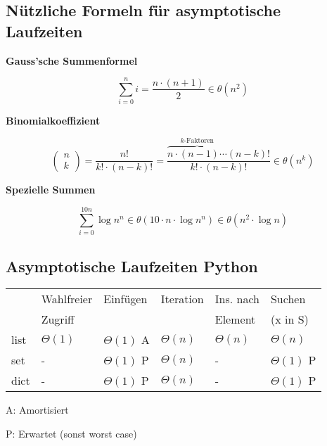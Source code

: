 \documentclass[german]{latex4ei/latex4ei_sheet}
\begin{document}
\begin{sectionbox}
\subsection{Nützliche Formeln für asymptotische Laufzeiten}\medskip

\textbf{Gauss'sche Summenformel}\par\vspace{-4px}
\begin{equation*}
    \boxed{\sum\limits_{i=0}^n i = \frac{n \cdot (n+1)}{2} \in \theta \left(n^2\right)}
\end{equation*}\par\smallskip

\textbf{Binomialkoeffizient}\par\vspace{-15px}
\begin{equation*}
    \left(\begin{array}{l} n \\ k \end{array}\right)=\frac{n !}{k ! \cdot(n-k) !} = \frac{ \overbrace{n \cdot (n-1) \cdots}^{k\text{-Faktoren}} (n-k)!}{k! \cdot (n-k)!} \in \theta \left( n^k \right)
\end{equation*}\par\smallskip

\textbf{Spezielle Summen}\par\vspace{-4px}
\begin{equation*}
    \sum\limits_{i=0}^{10n} \log{n^n} \in \theta \left(10 \cdot n \cdot \log{n^n}\right) \in \theta \left(n^2 \cdot \log{n}\right)
\end{equation*}\par\smallskip

\end{sectionbox}

\begin{sectionbox}
\subsection{Asymptotische Laufzeiten Python}\medskip

\begin{tabular*}{\columnwidth}{@{\extracolsep\fill}llllll@{}}
	 & Wahlfreier & Einfügen & Iteration & Ins. nach & Suchen \\ 
	 & Zugriff & & & Element & (x in S) \\ \cmrule
	list & $\Theta(1)$ & $\Theta(1)$ A &  $\Theta(n)$ &  $\Theta(n)$ &  $\Theta(n)$ \\
	set & - & $\Theta(1)$ P & $\Theta(n)$ & - & $\Theta(1)$ P\\
	dict & - & $\Theta(1)$ P & $\Theta(n)$ & - & $\Theta(1)$ P \\
\end{tabular*}\par\smallskip
A: Amortisiert\par
P: Erwartet (sonst worst case)
\end{sectionbox}


\end{document}
